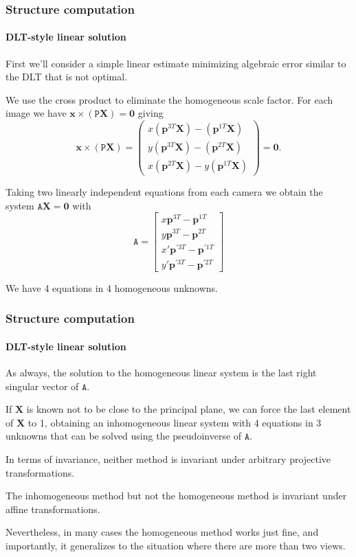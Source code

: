 \documentclass[aspectratio=169]{beamer}
\renewcommand{\vec}[1]{\boldsymbol{#1}}
\newcommand{\mat}[1]{\mathtt{#1}}
\begin{document}
\begin{frame}
\frametitle{Structure computation}
\framesubtitle{DLT-style linear solution}

First we'll consider a simple \alert{linear} estimate minimizing
algebraic error similar to the DLT that is not optimal.

\medskip

We use the cross product to eliminate the homogeneous scale factor.
For each image we have $\vec{x} \times (\mat{P}\vec{X})=\vec{0}$
giving
\begin{equation*}
\vec{x} \times (\mat{P}\vec{X}) =
\begin{pmatrix}
x(\vec{p}^{3 T}\vec{X})-(\vec{p}^{1 T}\vec{X}) \\
y(\vec{p}^{3 T}\vec{X})-(\vec{p}^{2 T}\vec{X}) \\
x(\vec{p}^{2 T}\vec{X})-y(\vec{p}^{1 T}\vec{X})
\end{pmatrix}
= \vec{0}.
\end{equation*}

Taking two linearly independent equations from each camera we obtain
the system $\mat{A}\vec{X}=\vec{0}$ with
\begin{equation*}
\mat{A} =
\begin{bmatrix}
x\vec{p}^{3 T}-\vec{p}^{1 T} \\
y\vec{p}^{3 T}-\vec{p}^{2 T} \\
x'\vec{p}^{\prime 3 T}-\vec{p}^{\prime 1 T} \\
y'\vec{p}^{\prime 3 T}-\vec{p}^{\prime 2 T}
\end{bmatrix}
\end{equation*}

We have 4 equations in 4 homogeneous unknowns.

\end{frame}

\begin{frame}
\frametitle{Structure computation}
\framesubtitle{DLT-style linear solution}

As always, the solution to the homogeneous linear system is the
\alert{last right singular} vector of $\mat{A}$.

\medskip

If $\vec{X}$ is known not to be close to the principal plane, we can
force the last element of $\vec{X}$ to 1, obtaining an inhomogeneous
linear system with 4 equations in 3 unknowns that can be solved using
the \alert{pseudoinverse} of $\mat{A}$.

\medskip

In terms of invariance, \alert{neither method} is invariant under
\alert{arbitrary} projective transformations.

\medskip

The inhomogeneous method but not the homogeneous method is invariant
under affine transformations.

\medskip

Nevertheless, in many cases the homogeneous method works just fine,
and importantly, it \alert{generalizes} to the situation where there
are \alert{more than two views}.

\end{frame}
\end{document}
